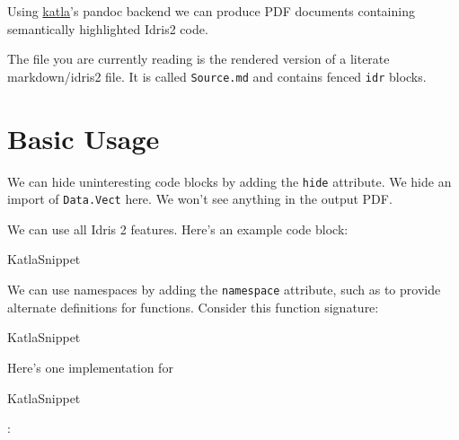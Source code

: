 Using \href{https://github.com/idris-community/katla}{katla}'s pandoc
backend we can produce PDF documents containing semantically highlighted
Idris2 code.

The file you are currently reading is the rendered version of a literate
markdown/idris2 file. It is called \texttt{Source.md} and contains
fenced \texttt{idr} blocks.

\hypertarget{basic-usage}{%
\section{Basic Usage}\label{basic-usage}}

We can hide uninteresting code blocks by adding the \texttt{hide}
attribute. We hide an import of \texttt{Data.Vect} here. We won't see
anything in the output PDF.

We can use all Idris 2 features. Here's an example code block:

\let\KatlaSnippet\relax{}\newcommand\KatlaSnippet[1][]{\UseVerbatim[#1]{KatlaSnippet}}
\begin{SaveVerbatim}[commandchars=\\\{\}]{KatlaSnippet}
\KatlaSpace{}\IdrisKeyword{:}\KatlaSpace{}\KatlaNewline{}
\KatlaSpace{}\IdrisKeyword{=}\KatlaSpace{}\KatlaSpace{}\IdrisFunction{+}\KatlaSpace{}\KatlaNewline{}
\end{SaveVerbatim}
\KatlaSnippet{}

We can use namespaces by adding the \texttt{namespace} attribute, such
as to provide alternate definitions for functions. Consider this
function signature:

\let\KatlaSnippet\relax{}\newcommand\KatlaSnippet[1][]{\UseVerbatim[#1]{KatlaSnippet}}
\begin{SaveVerbatim}[commandchars=\\\{\}]{KatlaSnippet}
\KatlaSpace{}\IdrisKeyword{:}\KatlaSpace{}\KatlaSpace{}\KatlaSpace{}\KatlaSpace{}\IdrisKeyword{\KatlaDash{}>}\KatlaSpace{}\KatlaSpace{}\IdrisKeyword{(}\KatlaSpace{}\IdrisFunction{+}\KatlaSpace{}\IdrisKeyword{)}\KatlaSpace{}\KatlaNewline{}
\end{SaveVerbatim}
\KatlaSnippet{}

Here's one implementation for
\let\KatlaSnippet\relax{}\newcommand\KatlaSnippet[1][]{\UseVerb[#1]{KatlaSnippet}}
\begin{SaveVerbatim}[commandchars=\\\{\}]{KatlaSnippet}
\KatlaNewline{}
\end{SaveVerbatim}
\KatlaSnippet{}:

